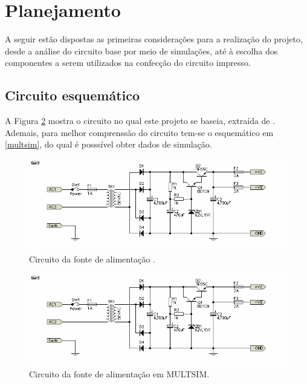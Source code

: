 \documentclass[a4paper,12pt,oneside,openany,table,xcdraw]{article}
\begin{document}

\newpage
\section{Planejamento} %
A seguir estão dispostas as primeiras considerações para a realização do projeto, desde a análise do circuito base por meio de simulações, até à escolha dos componentes a serem utilizados na confecção do circuito impresso.

\subsection{Circuito esquemático}
A Figura \ref{circuito} mostra o circuito no qual este projeto se baseia, extraída de \cite{amp}. Ademais, para melhor comprenssão do circuito tem-se o esquemático em \ref{multsim}, do qual é posssível obter dados de simulação.

\begin{figure}[H]
\centering
\captionsetup{font=scriptsize}
\includegraphics[width=16cm]{fonte}
\caption{Circuito da fonte de alimentação \cite{amp}.}
\label{circuito}
\end{figure}

\begin{figure}[H]
\centering
\captionsetup{font=scriptsize}
\includegraphics[width=16cm]{fonte}
\caption{Circuito da fonte de alimentação em MULTSIM.}
\label{circuito}
\end{figure}
\end{document}

